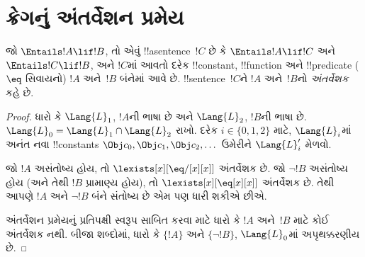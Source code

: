 \documentclass[../../../include/open-logic-section]{subfiles}
\begin{document}

\section{ક્રેગનું અંતર્વેશન પ્રમેય}

\begin{thm}[ક્રેગનું અંતર્વેશન પ્રમેય]
જો $\Entails !A \lif !B$, તો એવું !!a{sentence}~$!C$ છે કે
$\Entails !A \lif !C$ અને $\Entails !C \lif !B$, અને $!C$માં આવતો
દરેક !!{constant}, !!{function} અને !!{predicate} ($\eq$ સિવાયનો)
$!A$ અને~$!B$ બંનેમાં આવે છે. !!{sentence}~$!C$ને $!A$ અને~$!B$નો
\emph{અંતર્વેશક} કહે છે.
\end{thm}

\begin{proof}
ધારો કે $\Lang{L}_1$, $!A$ની ભાષા છે અને $\Lang{L}_2$, $!B$ની ભાષા
છે. $\Lang{L}_0 = \Lang{L}_1 \cap \Lang{L}_2$ રાખો. દરેક $i \in
\{0, 1, 2 \}$ માટે, $\Lang{L}_i$માં અનંત નવા !!{constant}s
$\Obj c_0, \Obj c_1, \Obj c_2, \dots$ ઉમેરીને $\Lang{L}'_i$ મેળવો.

જો $!A$ અસંતોષ્ય હોય, તો $\lexists[x][\eq/[x][x]]$ અંતર્વેશક છે.
જો $\lnot !B$ અસંતોષ્ય હોય (અને તેથી $!B$ પ્રામાણ્ય હોય), તો
$\lexists[x][\eq[x][x]]$ અંતર્વેશક છે. તેથી આપણે $!A$ અને
$\lnot !B$ બંને સંતોષ્ય છે એમ પણ ધારી શકીએ છીએ.

અંતર્વેશન પ્રમેયનું પ્રતિપક્ષી સ્વરૂપ સાબિત કરવા માટે ધારો કે $!A$
અને~$!B$ માટે કોઈ અંતર્વેશક નથી. બીજા શબ્દોમાં, ધારો કે $\{!A\}$ અને
$\{\lnot !B\}$, $\Lang{L}_0$માં અપૃથક્કરણીય છે.


\end{proof}
\end{document}
